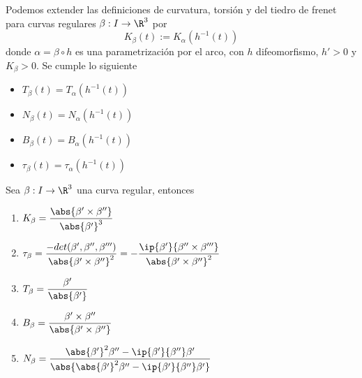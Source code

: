 \documentclass{article}
\begin{document}
\noindent Podemos extender las definiciones de curvatura, torsión y del tiedro de frenet para
curvas regulares $\beta: I\to\R^{3}$ por
\begin{equation*}
    K_{\beta}(t):=K_{\alpha}(h^{-1}(t))
\end{equation*}
donde $\alpha=\beta\circ h$ es una parametrización por el arco, con $h$ difeomorfismo, $h'>0$ y
$K_{\beta}>0$. Se cumple lo siguiente
\begin{itemize}
    \item $T_{\beta}(t)=T_{\alpha}(h^{-1}(t))$
    \item $N_{\beta}(t)=N_{\alpha}(h^{-1}(t))$
    \item $B_{\beta}(t)=B_{\alpha}(h^{-1}(t))$
    \item $\tau_{\beta}(t)=\tau_{\alpha}(h^{-1}(t))$
\end{itemize}

\begin{prop}
    Sea $\beta: I\to\R^{3}$ una curva regular, entonces
    \begin{enumerate}
        \item $K_{\beta}=\dfrac{\abs{\beta'\times\beta''}}{\abs{\beta'}^{3}}$
        \item $\tau_{\beta}=\dfrac{-det(\beta',\beta'',\beta''')}{\abs{\beta'\times\beta''}^{2}}=
        -\dfrac{\ip{\beta'}{\beta''\times\beta'''}}{\abs{\beta'\times\beta''}^{2}}$
        \item $T_{\beta}=\dfrac{\beta'}{\abs{\beta'}}$
        \item $B_{\beta}=\dfrac{\beta'\times\beta''}{\abs{\beta'\times\beta''}}$
        \item $N_{\beta}=\dfrac{\abs{\beta'}^{2}\beta''-\ip{\beta'}{\beta''}\beta'}
        {\abs{\abs{\beta'}^{2}\beta''-\ip{\beta'}{\beta''}\beta'}}$
    \end{enumerate}
\end{prop}

\end{document}
